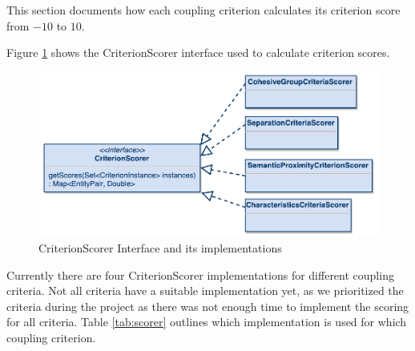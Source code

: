 This section documents how each coupling criterion calculates its criterion score from $-10$ to $10$. 

Figure \ref{fig:scorer} shows the CriterionScorer interface used to calculate criterion scores. 

\begin{figure}[H]
	\begin{center}
		\includegraphics[scale=0.7]{diagrams/scorer.pdf}
		\caption{CriterionScorer Interface and its implementations}
		\label{fig:scorer}
	\end{center}
\end{figure}


Currently there are four CriterionScorer implementations for different coupling criteria. Not all criteria have a suitable implementation yet, as we prioritized the criteria during the project as there was not enough time to implement the scoring for all criteria. Table \ref{tab:scorer} outlines which implementation is used for which coupling criterion.

